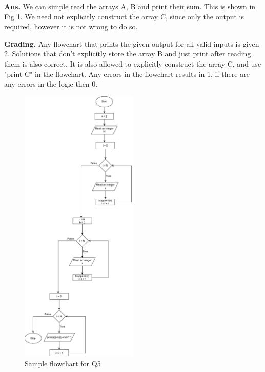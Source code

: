\documentclass{article}
\begin{document}
\begin{flushleft}

\textbf{Ans. } We can simple read the arrays A, B and print their sum. This is shown in Fig \ref{Q5}.
We need not explicitly construct the array C, since only the output is required, however it is not wrong
to do so.

\end{flushleft}

\begin{flushleft}

\textbf{Grading. } Any flowchart that prints the given output for all valid inputs is given 2. Solutions that 
don't explicitly store the array B and just print after reading them is also correct. It is also allowed 
to explicitly construct the array C, and use "print C" in the flowchart.
Any errors in the flowchart results in 1, if there are any errors in the logic then 0.

\end{flushleft}

\begin{figure}[ht]
    \centering
    \includegraphics[width=0.5\textwidth]{Q5.png}
    \caption{Sample flowchart for Q5}
    \label{Q5}
\end{figure}
\end{document}
